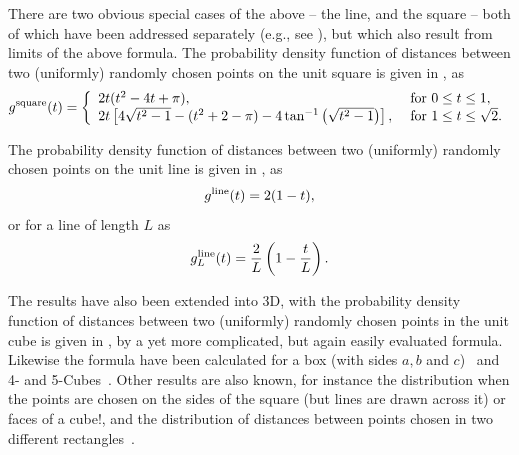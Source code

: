 \documentclass{article}
\begin{document}
There are two obvious special cases of the above -- the line, and the
square -- both of which have been addressed separately (e.g., see
\cite{philip:_probab_distr_distan_between_two,weisstein:_squar_line_picking}),
but which also result from limits of the above formula. The
probability density function of distances between two (uniformly)
randomly chosen points on the unit square is given in
\cite{weisstein:_squar_line_picking}, as
\begin{equation}
  \label{eq:square_line}
  g^{\rm square}(t) = \left\{ \begin{array}{ll}
      2t (t^2-4t+\pi), & \mbox{ for } 0 \leq t \leq 1, \\
      2t \left[4 \sqrt{t^2-1} - (t^2+2-\pi) - 4 \tan^{-1} \left(\sqrt{t^2-1} \right)\right], 
               & \mbox{ for } 1 \leq t \leq \sqrt{2} . \\ 
    \end{array} \right.
\end{equation}

The probability density function of distances between two (uniformly)
randomly chosen points on the unit line is given in
\cite{weisstein:_line_line_picking,b.ghosh51:_random_rect}, as
\begin{equation}
  \label{eq:line_line}
  g^{\rm line}(t) = 2(1-t),
\end{equation}
or for a line of length $L$ as
\begin{equation}
  \label{eq:line_lineL}
  g^{\rm line}_L(t) = \frac{2}{L} \left( 1-\frac{t}{L} \right).
\end{equation}

The results have also been extended into 3D, with the probability
density function of distances between two (uniformly) randomly chosen
points in the unit cube is given in
\cite{mathai99:_distan,weisstein:_cube_line_picking}, by a yet more
complicated, but again easily evaluated formula. Likewise the formula
have been calculated for a box (with sides $a,b$ and
$c$)~\cite{philip:_probab_distr_distan_between_two} and 4- and
5-Cubes~\cite{philip:_probab_distr_distan_between_two_4d}. Other
results are also known, for instance the distribution when the points
are chosen on the sides of the square (but lines are drawn across it)
or faces of a cube!\cite{mathai99:_distan}, and the distribution of
distances between points chosen in two different
rectangles~\cite{b.ghosh51:_random_rect}.
\end{document}
